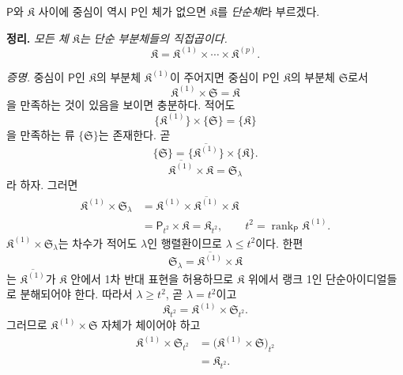 \(\mathsf P\)와 \(\mathfrak K\) 사이에 중심이 역시 \(\mathsf P\)인 체가 없으면 \(\mathfrak K\)를 \emph{단순체}라 부르겠다.

\textbf{정리.} \emph{모든 체 \(\mathfrak K\)는 단순 부분체들의 직접곱이다.}
\[
        \mathfrak K
        =\mathfrak K^{(1)}\times\cdots
        \times\mathfrak K^{(p)}.
\]

\emph{증명.} 중심이 \(\mathsf P\)인 \(\mathfrak K\)의 부분체 \(\mathfrak K^{(1)}\)이 주어지면 중심이 \(\mathsf P\)인 \(\mathfrak K\)의 부분체 \(\mathfrak S\)로서
\[
        \mathfrak K^{(1)}\times\mathfrak S
        =\mathfrak K
\]
을 만족하는 것이 있음을 보이면 충분하다. 적어도
\[
        \{\mathfrak K^{(1)}\}
        \times\{\mathfrak S\}
        =\{\mathfrak K\}
\]
을 만족하는 류 \(\{\mathfrak S\}\)는 존재한다. 곧
\[
        \{\mathfrak S\}
        =\{\overline{\mathfrak K^{(1)}}\}
         \times\{\mathfrak K\}.
\]
\[
        \overline{\mathfrak K^{(1)}}\times\mathfrak K
        =\mathfrak S_\lambda
\]
라 하자. 그러면
\[
\begin{aligned}
\mathfrak K^{(1)}\times\mathfrak S_\lambda
&=\mathfrak K^{(1)}
  \times\overline{\mathfrak K^{(1)}}\times\mathfrak K\\
&=\mathsf P_{t^2}\times\mathfrak K
 =\mathfrak K_{t^2},
\qquad
t^2=\operatorname{rank}_{\mathsf P}\mathfrak K^{(1)}.
\end{aligned}
\]
\(\mathfrak K^{(1)}\times\mathfrak S_\lambda\)는 차수가 적어도 \(\lambda\)인 행렬환이므로 \(\lambda\leq t^2\)이다. 한편
\[
        \mathfrak S_\lambda
        =\overline{\mathfrak K^{(1)}}\times\mathfrak K
\]
는 \(\overline{\mathfrak K^{(1)}}\)가 \(\mathfrak K\) 안에서 1차 반대 표현을 허용하므로 \(\mathfrak K\) 위에서 랭크 1인 단순아이디얼들로 분해되어야 한다. 따라서 \(\lambda\geq t^2\), 곧 \(\lambda=t^2\)이고
\[
        \mathfrak K_{t^2}
        =\mathfrak K^{(1)}\times\mathfrak S_{t^2}.
\]
그러므로 \(\mathfrak K^{(1)}\times\mathfrak S\) 자체가 체이어야 하고
\[
\begin{aligned}
\mathfrak K^{(1)}\times\mathfrak S_{t^2}
&=\bigl(\mathfrak K^{(1)}
  \times\mathfrak S\bigr)_{t^2}\\
&=\mathfrak K_{t^2}.
\end{aligned}
\]

